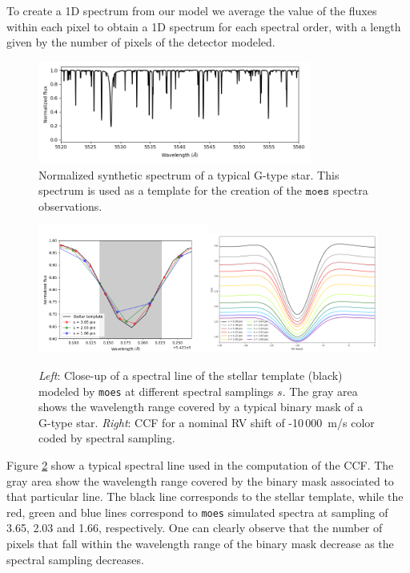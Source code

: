 \documentclass{article}
\begin{document}
To create a 1D spectrum from our model we average the value of the fluxes within each pixel to obtain a 1D spectrum for each spectral order, with a length given by the number of pixels of the detector modeled.

\begin{figure}[h!]
    \centering
    \includegraphics[width=0.8\textwidth]{template_spec.png}
    \caption{Normalized synthetic spectrum of a typical G-type star. This spectrum is used as a template for the creation of the $\texttt{moes}$ spectra observations.}
    \label{fig:template}
\end{figure}

\begin{figure}
    \centering
    \includegraphics[width=0.5\textwidth]{line_example_mask.png}\includegraphics[width=0.5\textwidth]{ccf_compare.png}
    \caption{\textit{Left}: Close-up of a spectral line of the stellar template (black) modeled by \texttt{moes} at different spectral samplings $s$. The gray area shows the wavelength range covered by a typical binary mask of a G-type star. \textit{Right}: CCF for a nominal RV shift of -10\,000~m/s color coded by spectral sampling.}
    \label{fig:mask}
\end{figure}
Figure \ref{fig:mask} show a typical spectral line used in the computation of the CCF. The gray area show the wavelength range covered by the binary mask associated to that particular line. The black line corresponds to the stellar template, while the red, green and blue lines correspond to \texttt{moes} simulated spectra at sampling of 3.65, 2.03 and 1.66, respectively. One can clearly observe that the number of  pixels that fall within the wavelength range of the binary mask decrease as the spectral sampling decreases.
\end{document}
